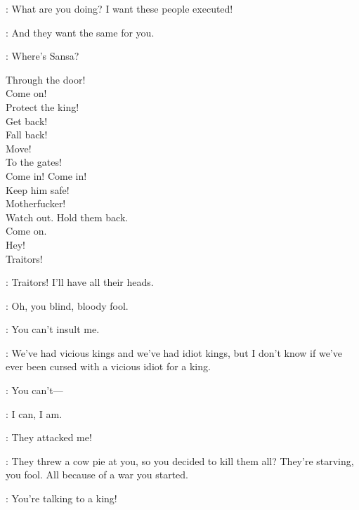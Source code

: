 
\JOFFREY: What are you doing? I want these people executed! 

\HOUND: And they want the same for you.


\TYRION: Where's Sansa? 


Through the door! \\
Come on! \\
Protect the king! \\
Get back! \\
Fall back! \\
Move! \\
To the gates! \\
Come in! Come in! \\
Keep him safe! \\
Motherfucker! \\
Watch out. Hold them back.\\ 
Come on. \\
Hey! \\
Traitors! 


\JOFFREY: Traitors! I'll have all their heads. 

\TYRION: Oh, you blind, bloody fool. 

\JOFFREY: You can't insult me. 

\TYRION: We've had vicious kings and we've had idiot kings, but I don't know if we've ever been cursed with a vicious idiot for a king. 

\JOFFREY: You can't--- 

\TYRION: I can, I am. 

\JOFFREY: They attacked me! 

\TYRION: They threw a cow pie at you, so you decided to kill them all? They're starving, you fool. All because of a war you started. 

\JOFFREY: You're talking to a king! 


